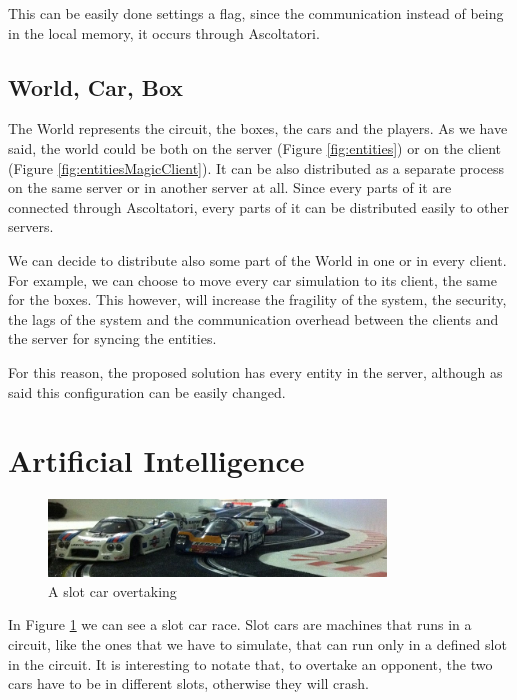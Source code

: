 This can be easily done settings a flag, since the communication instead of being in the local memory, it occurs through Ascoltatori.

\subsection{World, Car, Box}

The World represents the circuit, the boxes, the cars and the players. As we have said, the world could be both on the server (Figure \ref{fig:entities}) or on the client (Figure \ref{fig:entitiesMagicClient}). It can be also distributed as a separate process on the same server or in another server at all. Since every parts of it are connected through Ascoltatori, every parts of it can be distributed easily to other servers.

We can decide to distribute also some part of the World in one or in every client. For example, we can choose to move every car simulation to its client, the same for the boxes. This however, will increase the fragility of the system, the security, the lags of the system and the communication overhead between the clients and the server for  syncing the entities.

For this reason, the proposed solution has every entity in the server, although as said this configuration can be easily changed.

\section{Artificial Intelligence}

\begin{figure}[H]
\centering %
\includegraphics[width=0.8\textwidth]{./img/overtaking.jpg}
\caption{A slot car overtaking}
\label{fig:overtaking}
\end{figure}

In Figure \ref{fig:overtaking} we can see a slot car race. Slot cars are machines that runs in a circuit, like the ones that we have to simulate, that can run only in a defined slot in the circuit. It is interesting to notate that, to overtake an opponent, the two cars have to be in different slots, otherwise they will crash.


